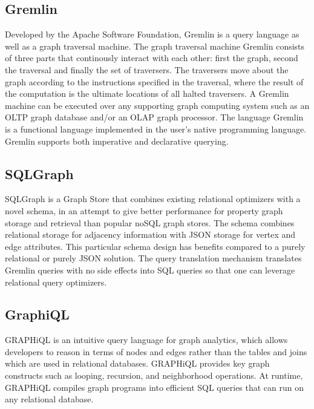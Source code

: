 \documentclass[11pt,singlecolumn]{scrartcl}
\begin{document}
\subsection{Gremlin}
Developed by the Apache Software Foundation, Gremlin is a query language as well as a graph traversal machine. The graph traversal machine Gremlin consists of three parts that continously interact with each other: first the graph, second the traversal and finally the set of traversers. The traversers move about the graph according to the instructions specified in the traversal, where the result of the computation is the ultimate locations of all halted traversers. A Gremlin machine can be executed over any supporting graph computing system such as an OLTP graph database and/or an OLAP graph processor. The language Gremlin is a functional language implemented in the user’s native programming language. Gremlin supports both imperative and declarative querying.
\cite{Gremlin}


\subsection{SQLGraph}
SQLGraph is a Graph Store that combines existing relational optimizers with a novel schema, in an attempt to give better performance for property graph storage and retrieval than popular noSQL graph stores. The schema combines relational storage for adjacency information with JSON storage for vertex and edge attributes. This particular schema design has benefits compared to a purely relational or purely JSON solution. The query translation mechanism translates Gremlin queries with no side effects into SQL queries so that one can leverage relational query optimizers. \cite{Sun:2015}


\subsection{GraphiQL}
GRAPHiQL is an intuitive query language for graph analytics, which allows developers to reason in terms of nodes and edges rather than the tables and joins which are used in relational databases. GRAPHiQL provides key graph constructs such as looping, recursion, and neighborhood operations. At runtime, GRAPHiQL compiles graph programs into efficient SQL queries that can run on any relational database. \cite {Graphiql}
\clearpage

\end{document}
